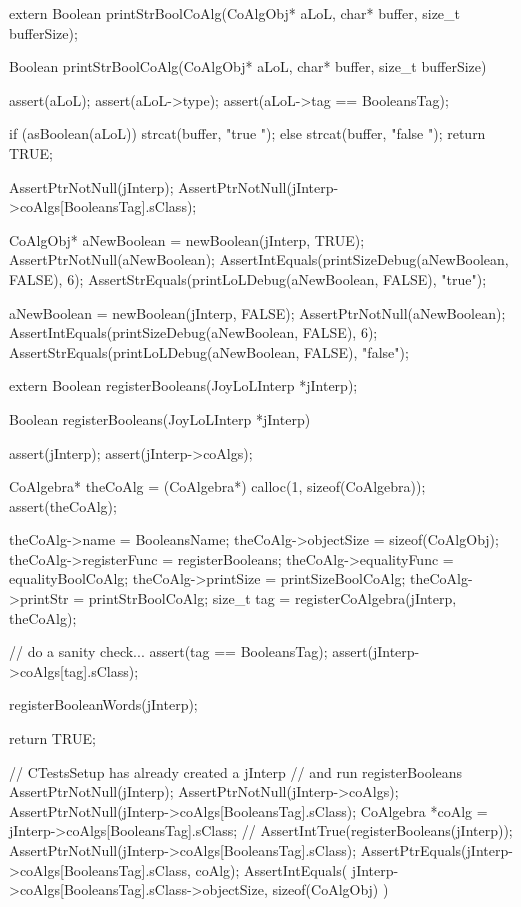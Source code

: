\startCHeader
extern Boolean printStrBoolCoAlg(CoAlgObj* aLoL,
                                 char* buffer, size_t bufferSize);
\stopCHeader

\startCCode
Boolean printStrBoolCoAlg(CoAlgObj* aLoL,
                          char* buffer, size_t bufferSize) {
  assert(aLoL);
  assert(aLoL->type);
  assert(aLoL->tag == BooleansTag);

  if (asBoolean(aLoL)) strcat(buffer, "true ");
  else strcat(buffer, "false ");
  return TRUE;
}
\stopCCode


\startCTest
  AssertPtrNotNull(jInterp);
  AssertPtrNotNull(jInterp->coAlgs[BooleansTag].sClass);

  CoAlgObj* aNewBoolean = newBoolean(jInterp, TRUE);
  AssertPtrNotNull(aNewBoolean);
  AssertIntEquals(printSizeDebug(aNewBoolean, FALSE), 6);
  AssertStrEquals(printLoLDebug(aNewBoolean, FALSE), "true");

  aNewBoolean = newBoolean(jInterp, FALSE);
  AssertPtrNotNull(aNewBoolean);
  AssertIntEquals(printSizeDebug(aNewBoolean, FALSE), 6);
  AssertStrEquals(printLoLDebug(aNewBoolean, FALSE), "false");
\stopCTest
\stopTestCase
\stopTestSuite

\startTestSuite[registerBooleans]

\startCHeader
extern Boolean registerBooleans(JoyLoLInterp *jInterp);
\stopCHeader

\startCCode
Boolean registerBooleans(JoyLoLInterp *jInterp) {
  assert(jInterp);
  assert(jInterp->coAlgs);
  
  CoAlgebra* theCoAlg    = (CoAlgebra*) calloc(1, sizeof(CoAlgebra));
  assert(theCoAlg);
  
  theCoAlg->name         = BooleansName;
  theCoAlg->objectSize   = sizeof(CoAlgObj);
  theCoAlg->registerFunc = registerBooleans;
  theCoAlg->equalityFunc = equalityBoolCoAlg;
  theCoAlg->printSize    = printSizeBoolCoAlg;
  theCoAlg->printStr     = printStrBoolCoAlg;
  size_t tag = registerCoAlgebra(jInterp, theCoAlg);
  
  // do a sanity check...
  assert(tag == BooleansTag);
  assert(jInterp->coAlgs[tag].sClass);
  
  registerBooleanWords(jInterp);
  
  return TRUE;
}
\stopCCode


\startCTest
  // CTestsSetup has already created a jInterp
  // and run registerBooleans
  AssertPtrNotNull(jInterp);
  AssertPtrNotNull(jInterp->coAlgs);
  AssertPtrNotNull(jInterp->coAlgs[BooleansTag].sClass);
  CoAlgebra *coAlg = jInterp->coAlgs[BooleansTag].sClass;
//  AssertIntTrue(registerBooleans(jInterp));
  AssertPtrNotNull(jInterp->coAlgs[BooleansTag].sClass);
  AssertPtrEquals(jInterp->coAlgs[BooleansTag].sClass, coAlg);
  AssertIntEquals(
    jInterp->coAlgs[BooleansTag].sClass->objectSize,
    sizeof(CoAlgObj)
  )
\stopCTest
\stopTestCase
\stopTestSuite

